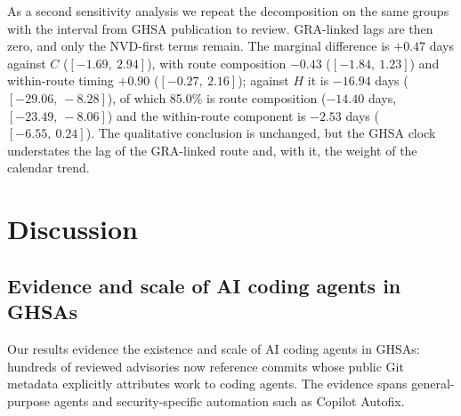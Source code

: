 \documentclass[smallextended,natbib]{svjour3}
\begin{document}

As a second sensitivity analysis we repeat the decomposition on the same groups
with the interval from GHSA publication to review.  GRA-linked lags are then
zero, and only the NVD-first terms remain.  The marginal difference is
$+0.47$ days against $C$ ($[-1.69,\ 2.94]$), with route composition $-0.43$
($[-1.84,\ 1.23]$) and within-route timing $+0.90$ ($[-0.27,\ 2.16]$); against
$H$ it is $-16.94$ days ($[-29.06,\ -8.28]$), of which 85.0\% is route
composition ($-14.40$ days, $[-23.49,\ -8.06]$) and the within-route component
is $-2.53$ days ($[-6.55,\ 0.24]$).  The qualitative conclusion is unchanged,
but the GHSA clock understates the lag of the GRA-linked route and, with it,
the weight of the calendar trend.

\section{Discussion}
\label{sec:discussion}

\subsection{Evidence and scale of AI coding agents in GHSAs} \label{sec:evid}

Our   results evidence the  existence and scale of AI coding agents in GHSAs: hundreds of reviewed advisories
now reference commits whose public Git metadata explicitly attributes work to
coding agents.  The evidence spans general-purpose agents and security-specific
automation such as Copilot Autofix.  
\end{document}

